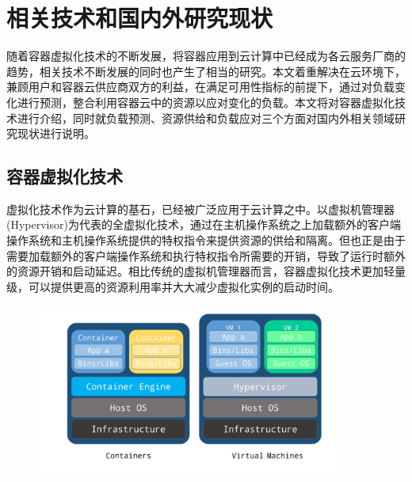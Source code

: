 
\chapter{相关技术和国内外研究现状}
\label{chap:art_of_state}
随着容器虚拟化技术的不断发展，将容器应用到云计算中已经成为各云服务厂商的趋势，相关技术不断发展的同时也产生了相当的研究。本文着重解决在云环境下，兼顾用户和容器云供应商双方的利益，在满足可用性指标的前提下，通过对负载变化进行预测，整合利用容器云中的资源以应对变化的负载。本文将对容器虚拟化技术进行介绍，同时就负载预测、资源供给和负载应对三个方面对国内外相关领域研究现状进行说明。

\section{容器虚拟化技术}
虚拟化技术作为云计算的基石，已经被广泛应用于云计算之中\cite{zhang2010cloud}。以虚拟机管理器(Hypervisor)为代表的全虚拟化技术，通过在主机操作系统之上加载额外的客户端操作系统和主机操作系统提供的特权指令来提供资源的供给和隔离。但也正是由于需要加载额外的客户端操作系统和执行特权指令所需要的开销，导致了运行时额外的资源开销和启动延迟\cite{bernstein2014containers}。相比传统的虚拟机管理器而言，容器虚拟化技术更加轻量级，可以提供更高的资源利用率并大大减少虚拟化实例的启动时间\cite{soltesz2007container}。

\begin{figure}[h]
\centering
\includegraphics[width=0.9\textwidth]{./figure/container-vm}
\end{figure}

